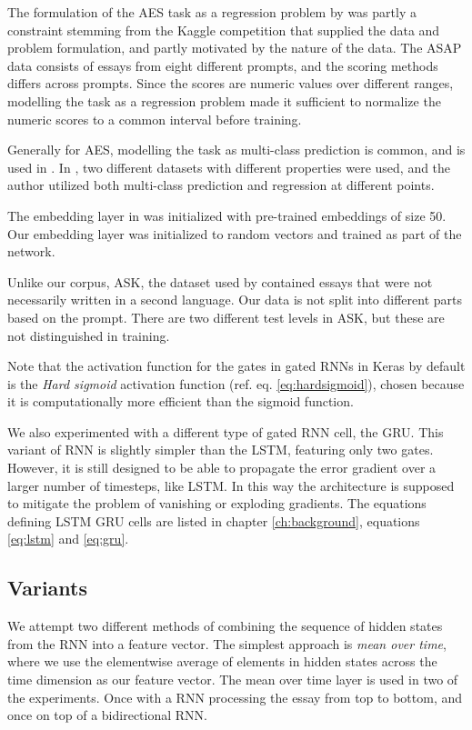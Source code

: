 The formulation of the \ac{AES} task as a regression problem by \citeauthor{taghipour16}
was partly a constraint stemming from the Kaggle competition that supplied
the data and problem formulation, and partly motivated by the nature of the
data. The ASAP data consists of essays from eight different prompts, and the
scoring methods differs across prompts. Since the scores are numeric values over
different ranges, modelling the task as a regression problem made it sufficient
to normalize the numeric scores to a common interval before training.

Generally for \ac{AES}, modelling the task as multi-class prediction is common,
and is used in \autocite{vajjala18universalCEFR}. In \autocite{vajjala17}, two
different datasets with different properties were used, and the author utilized
both multi-class prediction and regression at different points.

The embedding layer in \textcite{taghipour16} was initialized with
pre-trained embeddings of size 50. Our embedding layer was initialized to
random vectors and trained as part of the network.

Unlike our corpus, ASK, the dataset used by \citeauthor{taghipour16}
contained essays that were not necessarily written in a second language. Our
data is not split into different parts based on the prompt. There are two
different test levels in ASK, but these are not distinguished in training.

Note that the activation function for the gates in gated RNNs in Keras by
default is the \emph{Hard sigmoid} activation function (ref. eq.
\ref{eq:hardsigmoid}), chosen because it is computationally more efficient
than the sigmoid function.

We also experimented with a different type of gated \ac{RNN} cell, the
\ac{GRU}. This variant of \ac{RNN} is slightly simpler than the \ac{LSTM},
featuring only two gates. However, it is still designed to be able to
propagate the error gradient over a larger number of timesteps, like
\ac{LSTM}. In this way the architecture is supposed to mitigate the problem
of vanishing or exploding gradients. The equations defining \ac{LSTM}
\ac{GRU} cells are listed in chapter \ref{ch:background}, equations
\ref{eq:lstm} and \ref{eq:gru}.


\subsection{Variants}

We attempt two different methods of combining the sequence of hidden states
from the \ac{RNN} into a feature vector. The simplest approach is \emph{mean
over time}, where we use the elementwise average of elements in hidden states
across the time dimension as our feature vector. The mean over time layer is
used in two of the experiments. Once with a \ac{RNN} processing the essay
from top to bottom, and once on top of a bidirectional RNN.

